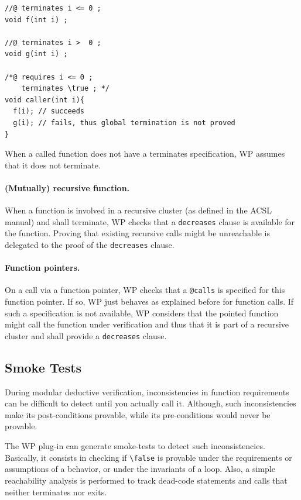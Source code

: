 \begin{lstlisting}[style=c]
//@ terminates i <= 0 ;
void f(int i) ;

//@ terminates i >  0 ;
void g(int i) ;

/*@ requires i <= 0 ;
    terminates \true ; */
void caller(int i){
  f(i); // succeeds
  g(i); // fails, thus global termination is not proved
}
\end{lstlisting}

When a called function does not have a terminates specification, WP assumes that
it does not terminate.

\paragraph{(Mutually) recursive function.} When a function is involved in a
recursive cluster (as defined in the ACSL manual) and shall terminate, WP checks that a
\verb+decreases+ clause is available for the function. Proving that existing
recursive calls might be unreachable is delegated to the proof of the
\verb+decreases+ clause.

\paragraph{Function pointers. } On a call via a function pointer, WP checks that
a \verb+@calls+ is specified for this function pointer. If so, WP just behaves
as explained before for function calls. If such a specification is not available,
WP considers that the pointed function might call the function under
verification and thus that it is part of a recursive cluster and shall provide
a \verb+decreases+ clause.

\subsection{Smoke Tests}

During modular deductive verification, inconsistencies in function requirements
can be difficult to detect until you actually call it.
Although, such inconsistencies make its post-conditions provable, while its pre-conditions
would never be provable.

The \textsf{WP} plug-in can generate smoke-tests to detect such inconsistencies.
Basically, it consists in checking if \verb+\false+ is provable under the requirements
or assumptions of a behavior, or under the invariants of a loop. Also, a simple reachability
analysis is performed to track dead-code statements and calls that neither terminates nor exits.

